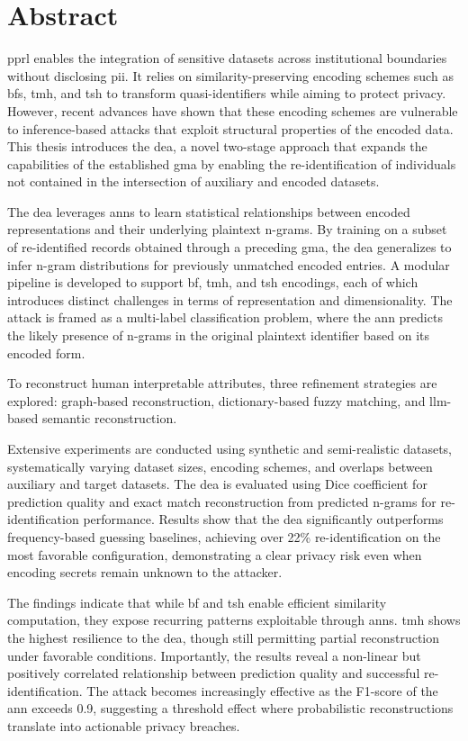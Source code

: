 

\chapter{Abstract}

\ac{pprl} enables the integration of sensitive datasets across institutional boundaries without disclosing \ac{pii}.
It relies on similarity-preserving encoding schemes such as \ac{bf}s, \ac{tmh}, and \ac{tsh} to transform quasi-identifiers while aiming to protect privacy.
However, recent advances have shown that these encoding schemes are vulnerable to inference-based attacks that exploit structural properties of the encoded data.
This thesis introduces the \ac{dea}, a novel two-stage approach that expands the capabilities of the established \ac{gma} by enabling the re-identification of individuals not contained in the intersection of auxiliary and encoded datasets.

The \ac{dea} leverages \ac{ann}s to learn statistical relationships between encoded representations and their underlying plaintext n-grams.
By training on a subset of re-identified records obtained through a preceding \ac{gma}, the \ac{dea} generalizes to infer n-gram distributions for previously unmatched encoded entries.
A modular pipeline is developed to support \ac{bf}, \ac{tmh}, and \ac{tsh} encodings, each of which introduces distinct challenges in terms of representation and dimensionality.
The attack is framed as a multi-label classification problem, where the \ac{ann} predicts the likely presence of n-grams in the original plaintext identifier based on its encoded form.

To reconstruct human interpretable attributes, three refinement strategies are explored: graph-based reconstruction, dictionary-based fuzzy matching, and \ac{llm}-based semantic reconstruction.

Extensive experiments are conducted using synthetic and semi-realistic datasets, systematically varying dataset sizes, encoding schemes, and overlaps between auxiliary and target datasets.
The \ac{dea} is evaluated using Dice coefficient for prediction quality and exact match reconstruction from predicted n-grams for re-identification performance.
Results show that the \ac{dea} significantly outperforms frequency-based guessing baselines, achieving over 22\% re-identification on the most favorable configuration, demonstrating a clear privacy risk even when encoding secrets remain unknown to the attacker.

The findings indicate that while \ac{bf} and \ac{tsh} enable efficient similarity computation, they expose recurring patterns exploitable through \ac{ann}s.
\ac{tmh} shows the highest resilience to the \ac{dea}, though still permitting partial reconstruction under favorable conditions.
Importantly, the results reveal a non-linear but positively correlated relationship between prediction quality and successful re-identification.
The attack becomes increasingly effective as the F1-score of the \ac{ann} exceeds 0.9, suggesting a threshold effect where probabilistic reconstructions translate into actionable privacy breaches.

